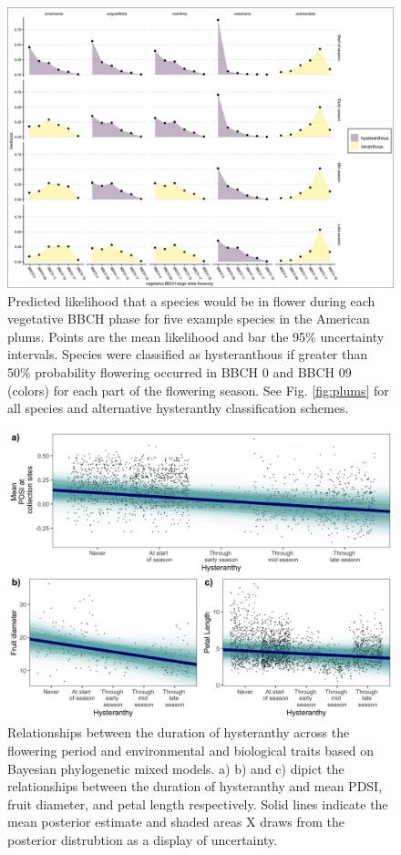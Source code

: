 \documentclass{article}[11pt]
\begin{document}
{\begin{figure}[h!]
    \centering
 \includegraphics[width=\textwidth]{..//..//Plots/ord_quants_exmpsps.jpeg}
    \caption{Predicted likelihood that a species would be in flower during each vegetative BBCH phase for five example species in the American plums. Points are the mean likelihood and bar the 95\% uncertainty intervals. Species were classified as hysteranthous if greater than 50\% probability flowering occurred in BBCH 0 and BBCH 09 (colors) for each part of the flowering season.
  See Fig. \ref{fig:plums} for all species and alternative hysteranthy classification schemes. }
    \label{fig:ordinals}
\end{figure}




\begin{figure}[h!]
    \centering
 \includegraphics[width=\textwidth]{..//..//Plots/dataplots.jpeg}
    \caption{Relationships between the duration of hysteranthy across the flowering period and environmental and biological traits based on Bayesian phylogenetic mixed models. a) b) and c) dipict the relationships between the duration of hysteranthy and mean PDSI, fruit diameter, and petal length respectively. Solid lines indicate the mean posterior estimate and shaded areas X draws from the posterior distrubtion as a display of uncertainty. }
    \label{fig:prunes}
\end{figure}


}
\end{document}

